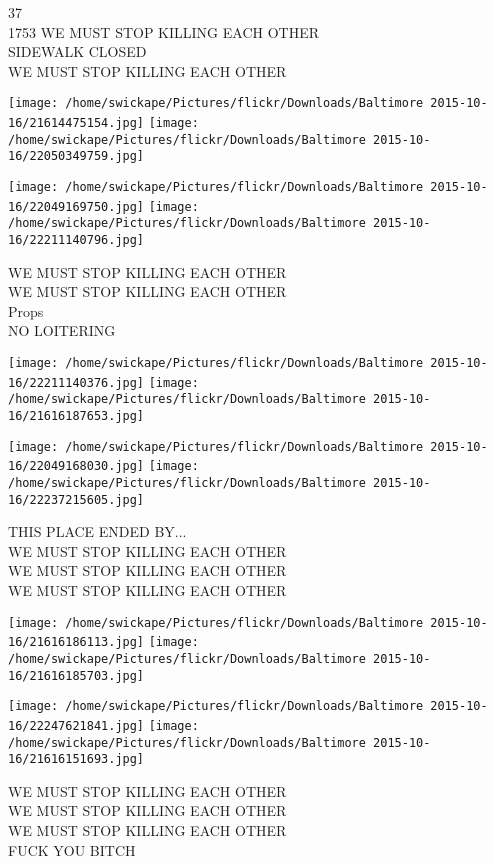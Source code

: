 \documentclass[10pt,letterpaper]{article}
\begin{document}
37\\
1753 WE MUST STOP KILLING EACH OTHER\\
SIDEWALK CLOSED\\
WE MUST STOP KILLING EACH OTHER
\pagebreak

\texttt{[image: /home/swickape/Pictures/flickr/Downloads/Baltimore 2015-10-16/21614475154.jpg]}
\texttt{[image: /home/swickape/Pictures/flickr/Downloads/Baltimore 2015-10-16/22050349759.jpg]}

\texttt{[image: /home/swickape/Pictures/flickr/Downloads/Baltimore 2015-10-16/22049169750.jpg]}
\texttt{[image: /home/swickape/Pictures/flickr/Downloads/Baltimore 2015-10-16/22211140796.jpg]}

WE MUST STOP KILLING EACH OTHER\\
WE MUST STOP KILLING EACH OTHER\\
Props\\
NO LOITERING
\pagebreak

\texttt{[image: /home/swickape/Pictures/flickr/Downloads/Baltimore 2015-10-16/22211140376.jpg]}
\texttt{[image: /home/swickape/Pictures/flickr/Downloads/Baltimore 2015-10-16/21616187653.jpg]}

\texttt{[image: /home/swickape/Pictures/flickr/Downloads/Baltimore 2015-10-16/22049168030.jpg]}
\texttt{[image: /home/swickape/Pictures/flickr/Downloads/Baltimore 2015-10-16/22237215605.jpg]}

THIS PLACE ENDED BY...\\
WE MUST STOP KILLING EACH OTHER\\
WE MUST STOP KILLING EACH OTHER\\
WE MUST STOP KILLING EACH OTHER
\pagebreak

\texttt{[image: /home/swickape/Pictures/flickr/Downloads/Baltimore 2015-10-16/21616186113.jpg]}
\texttt{[image: /home/swickape/Pictures/flickr/Downloads/Baltimore 2015-10-16/21616185703.jpg]}

\texttt{[image: /home/swickape/Pictures/flickr/Downloads/Baltimore 2015-10-16/22247621841.jpg]}
\texttt{[image: /home/swickape/Pictures/flickr/Downloads/Baltimore 2015-10-16/21616151693.jpg]}

WE MUST STOP KILLING EACH OTHER\\
WE MUST STOP KILLING EACH OTHER\\
WE MUST STOP KILLING EACH OTHER\\
FUCK YOU BITCH
\pagebreak
\end{document}
